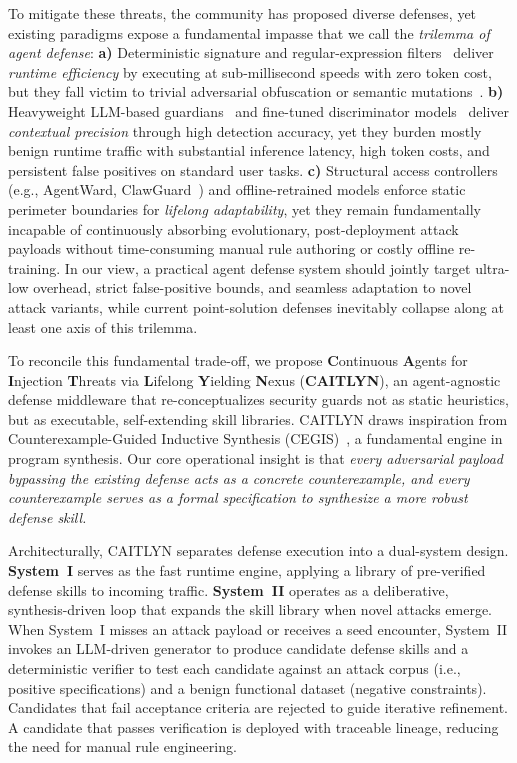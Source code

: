 To mitigate these threats, the community has proposed diverse
defenses, yet existing paradigms expose a fundamental impasse that we
call the \emph{trilemma of agent defense}: \textbf{a)} Deterministic
signature and regular-expression
filters~\cite{nemoguardrails,promptguard} deliver \emph{runtime
efficiency} by executing at sub-millisecond speeds with zero token cost,
but they fall victim to trivial adversarial obfuscation or semantic
mutations~\cite{tensortrust,liu-injection}. \textbf{b)} Heavyweight LLM-based
guardians~\cite{zheng-judge} and fine-tuned discriminator
models~\cite{promptguard,protectaideberta} deliver \emph{contextual
precision} through high detection accuracy, yet they burden mostly benign runtime traffic
with substantial inference latency, high token costs, and
persistent false positives on standard user tasks. \textbf{c)} Structural access
controllers (e.g., AgentWard, ClawGuard~\cite{agentward,clawguard})
and offline-retrained models enforce static perimeter boundaries for
\emph{lifelong adaptability}, yet they remain fundamentally incapable
of continuously absorbing evolutionary, post-deployment attack payloads
without time-consuming manual rule authoring or costly offline re-training. In
our view, a practical agent defense system should jointly target
ultra-low overhead, strict false-positive bounds, and seamless
adaptation to novel attack variants, while current point-solution defenses
inevitably collapse along at least one axis of this trilemma.

To reconcile this fundamental trade-off, we propose \textbf{C}ontinuous
\textbf{A}gents for \textbf{I}njection
\textbf{T}hreats via \textbf{L}ifelong \textbf{Y}ielding
\textbf{N}exus (\textbf{CAITLYN}), an agent-agnostic defense middleware that
re-conceptualizes security guards not as static heuristics, but as
executable, self-extending skill libraries. CAITLYN draws inspiration
from Counterexample-Guided Inductive Synthesis
(CEGIS)~\cite{sketch2006,sygus2013,flashfill2011}, a fundamental
engine in program synthesis. Our core operational insight is
that \emph{every adversarial payload bypassing the existing defense
  acts as a concrete counterexample, and every counterexample serves
  as a formal specification to synthesize a more robust defense
  skill.}

Architecturally, CAITLYN separates defense execution into a
dual-system design. \textbf{System~I} serves as
the fast runtime engine, applying a library of pre-verified defense
skills to incoming traffic. \textbf{System~II} operates as a
deliberative, synthesis-driven loop that expands the skill library when
novel attacks emerge. When System~I misses an attack payload or
receives a seed encounter, System~II invokes an LLM-driven generator to
produce candidate defense skills and a deterministic verifier to test
each candidate against an attack corpus (i.e., positive specifications) and
a benign functional dataset (negative constraints). Candidates that
fail acceptance criteria are rejected to guide iterative refinement. A
candidate that passes verification is deployed with traceable lineage,
reducing the need for manual rule engineering.

